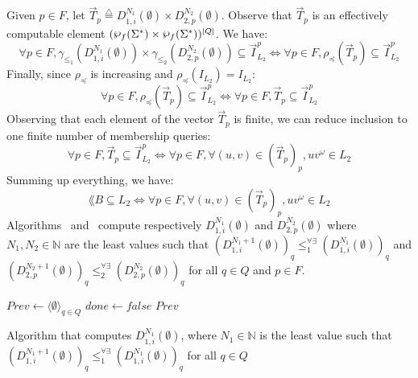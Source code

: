 Given $p \in F$, let $\vec{T}_p \overset{\triangle}{=} D_{1,i}^{N_1}(\emptyset)
\times D_{2,p}^{N_2}(\emptyset)$.
Observe that $\vec{T}_p$ is an effectively computable element
$(\fpowerset(\Sigma^*) \times \fpowerset(\Sigma^*))^{|Q|}$.
We have:
\[\forall p \in F, \gamma_{\leq_1}(D_{1,i}^{N_1}(\emptyset)) \times
\gamma_{\leq_2}(D_{2,p}^{N_2}(\emptyset)) \subseteq \vec{I}_{L_2}^p \Longleftrightarrow
\forall p \in F, \rho_{\preceq}(\vec{T}_p) \subseteq \vec{I}_{L_2}^p \]
Finally, since $\rho_{\preceq}$ is increasing
and $\rho_{\preceq}(I_{L_2}) = I_{L_2}$:
\[ \forall p \in F, \rho_{\preceq}(\vec{T}_p) \subseteq \vec{I}_{L_2}^p
\Longleftrightarrow
\forall p \in F, \vec{T}_p \subseteq \vec{I}_{L_2}^p\]
Observing that each element of the vector $\vec{T}_p$ is finite,
we can reduce inclusion to one finite number of membership queries:
\[\forall p \in F, \vec{T}_p \subseteq \vec{I}_{L_2}^p \Longleftrightarrow
\forall p \in F, \forall (u,v) \in (\vec{T}_p)_p, uv^{\omega} \in L_2\]
Summing up everything, we have:
\[ \lang{B} \subseteq L_2 \Longleftrightarrow
\forall p \in F, \forall (u,v) \in (\vec{T}_p)_p, uv^{\omega} \in L_2\]
Algorithms~ and~ compute respectively
$D_{1,i}^{N_1}(\emptyset)$ and $D_{2,p}^{N_2}(\emptyset)$
where $N_1,N_2 \in \mathbb{N}$ are the least values such that
$(D_{1,i}^{N_1+1}(\emptyset))_q \leq_1^{\forall \exists} (D_{1,i}^{N_1}(\emptyset))_q$
and
$(D_{2,p}^{N_2+1}(\emptyset))_q \leq_2^{\forall \exists} (D_{2,p}^{N_2}(\emptyset))_q$
for all $q \in Q$ and $p \in F$.

\begin{algorithm}[h]
\label{alg:prefixes}

\SetAlgoLined
\LinesNumbered
{}
$Prev \leftarrow \langle \emptyset \rangle_{q \in Q}$ \;
$done \leftarrow false$ \;
\Return $Prev$
\caption{Algorithm that computes $D_{1,i}^{N_1}(\emptyset)$, where
$N_1 \in \mathbb{N}$ is the least value such that
$(D_{1,i}^{N_1+1}(\emptyset))_q \leq_1^{\forall \exists} (D_{1,i}^{N_1}(\emptyset))_q$
for all $q \in Q$}
\end{algorithm}

